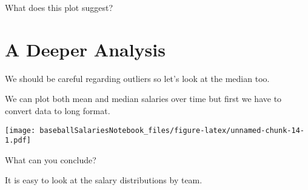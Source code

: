 \documentclass[]{article}
\newenvironment{Shaded}{\begin{snugshade}}{\end{snugshade}}
\newcommand{\KeywordTok}[1]{\textcolor[rgb]{0.13,0.29,0.53}{\textbf{#1}}}
\newcommand{\DataTypeTok}[1]{\textcolor[rgb]{0.13,0.29,0.53}{#1}}
\newcommand{\StringTok}[1]{\textcolor[rgb]{0.31,0.60,0.02}{#1}}
\newcommand{\OperatorTok}[1]{\textcolor[rgb]{0.81,0.36,0.00}{\textbf{#1}}}
\newcommand{\NormalTok}[1]{#1}
\begin{document}
What does this plot suggest?

\section{A Deeper Analysis}\label{a-deeper-analysis}

We should be careful regarding outliers so let's look at the median too.

\begin{Shaded}
\end{Shaded}

We can plot both mean and median salaries over time but first we have to
convert data to long format.

\begin{Shaded}
\end{Shaded}

\texttt{[image: baseballSalariesNotebook\_files/figure-latex/unnamed-chunk-14-1.pdf]}

What can you conclude?

It is easy to look at the salary distributions by team.

\begin{Shaded}
\end{Shaded}
\end{document}
